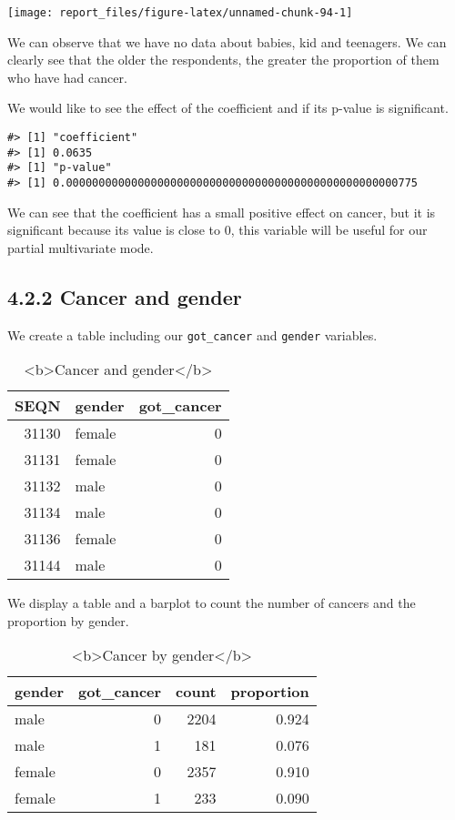 \documentclass[
]{article}
\begin{document}
\begin{center}\texttt{[image: report\_files/figure-latex/unnamed-chunk-94-1]} \end{center}

We can observe that we have no data about babies, kid and teenagers. We
can clearly see that the older the respondents, the greater the
proportion of them who have had cancer.

We would like to see the effect of the coefficient and if its p-value is
significant.

\begin{verbatim}
#> [1] "coefficient"
#> [1] 0.0635
#> [1] "p-value"
#> [1] 0.000000000000000000000000000000000000000000000000000775
\end{verbatim}

We can see that the coefficient has a small positive effect on cancer,
but it is significant because its value is close to 0, this variable
will be useful for our partial multivariate mode.

\hypertarget{cancer-and-gender}{%
\subsection{4.2.2 Cancer and gender}\label{cancer-and-gender}}

We create a table including our \texttt{got\_cancer} and \texttt{gender}
variables.

\begin{table}

\caption{\label{tab:unnamed-chunk-96}<b>Cancer and gender</b>}
\centering
\begin{tabular}[t]{r|l|r}
\hline
SEQN & gender & got\_cancer\\
\hline
31130 & female & 0\\
\hline
31131 & female & 0\\
\hline
31132 & male & 0\\
\hline
31134 & male & 0\\
\hline
31136 & female & 0\\
\hline
31144 & male & 0\\
\hline
\end{tabular}
\end{table}

We display a table and a barplot to count the number of cancers and the
proportion by gender.

\begin{table}

\caption{\label{tab:unnamed-chunk-97}<b>Cancer by gender</b>}
\centering
\begin{tabular}[t]{l|r|r|r}
\hline
gender & got\_cancer & count & proportion\\
\hline
male & 0 & 2204 & 0.924\\
\hline
male & 1 & 181 & 0.076\\
\hline
female & 0 & 2357 & 0.910\\
\hline
female & 1 & 233 & 0.090\\
\hline
\end{tabular}
\end{table}
\end{document}
